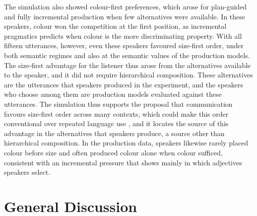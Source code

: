 \documentclass[10pt,a4paper,fleqn]{article}
\begin{document}
The simulation also showed colour-first preferences, which arose for plan-guided and fully incremental production when few alternatives were available.
In these speakers, colour won the competition at the first position, as incremental pragmatics predicts when colour is the more discriminating property.
With all fifteen utterances, however, even these speakers favoured size-first order, under both semantic regimes and also at the semantic values of the production models.
The size-first advantage for the listener thus arose from the alternatives available to the speaker, and it did not require hierarchical composition.
These alternatives are the utterances that speakers produced in the experiment, and the speakers who choose among them are production models evaluated against these utterances.
The simulation thus supports the proposal that communication favours size-first order across many contexts, which could make this order conventional over repeated language use \citep[p.~7:19]{scontras2019grammatical}, and it locates the source of this advantage in the alternatives that speakers produce, a source other than hierarchical composition.
In the production data, speakers likewise rarely placed colour before size and often produced colour alone when colour sufficed, consistent with an incremental pressure that shows mainly in which adjectives speakers select.



\section{General Discussion}
\label{sec:discussion}
\end{document}
